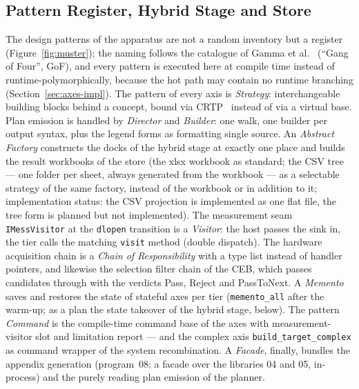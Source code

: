 \begin{nurlang}
\subsection{Pattern Register, Hybrid Stage and Store}\label{sec:impl-hybrid-lager}
The design patterns of the apparatus are not a random inventory but a register
(Figure~\ref{fig:muster}); the naming follows the catalogue of Gamma et al.~\cite{gamma1994patterns}
(\enquote{Gang of Four}, GoF), and every pattern is executed here at compile time instead of
runtime-polymorphically, because the hot path may contain no runtime branching
(Section~\ref{sec:axes-impl}). The pattern of every axis is \emph{Strategy}: interchangeable building
blocks behind a concept, bound via CRTP~\cite{coplien1995crtp} instead of via a virtual base. Plan
emission is handled by \emph{Director} and \emph{Builder}: one walk, one builder per output syntax,
plus the legend forms as formatting single source. An \emph{Abstract Factory} constructs the docks of
the hybrid stage at exactly one place and builds the result workbooks of the store (the xlsx workbook
as standard; the CSV tree --- one folder per sheet, always generated from the workbook --- as a
selectable strategy of the same factory, instead of the workbook or in addition to it; implementation
status: the CSV projection is implemented as one flat file, the tree form is planned but not
implemented).
The measurement seam \texttt{IMessVisitor} at the \texttt{dlopen} transition is a \emph{Visitor}: the
host passes the sink in, the tier calls the matching \texttt{visit} method (double dispatch). The
hardware acquisition chain is a \emph{Chain of Responsibility} with a type list instead of handler
pointers, and likewise the selection filter chain of the CEB, which passes candidates through with the
verdicts Pass, Reject and PassToNext. A \emph{Memento} saves and restores the state of stateful axes
per tier (\texttt{memento\_all} after the warm-up; as a plan the state takeover of the hybrid stage,
below). The pattern \emph{Command} is the compile-time command base of the axes with measurement-visitor
slot and limitation report --- and the complex axis \texttt{build\_target\_complex} as command wrapper
of the system recombination. A \emph{Facade}, finally, bundles the appendix generation (program~08: a
facade over the libraries 04 and 05, in-process) and the purely reading plan emission of the planner.
\begin{figure}[htbp]\centering
\begin{tikzpicture}[font=\footnotesize,
  mu/.style={draw,rounded corners,fill=blue!7,minimum width=3.6cm,minimum height=2.55cm,text width=3.4cm,align=center,inner sep=2pt}]

\end{tikzpicture}
\end{figure}
\end{nurlang}
